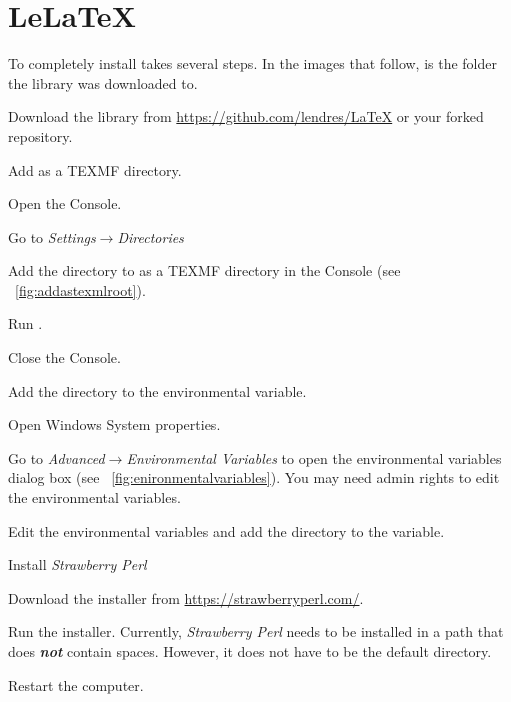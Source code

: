 \section{LeLaTeX}
To completely install \lelatex{} takes several steps.  In the images that follow,  is the folder the \lelatex{} library was downloaded to.

\begin{outline}
	\item Download the library from \href{https://github.com/lendres/LaTeX}{https://github.com/lendres/LaTeX} or your forked repository.
	\item Add \lelatex{} as a TEXMF directory.
	\begin{outline}
		\item Open the \miktex{} Console.
		\item Go to \emph{Settings$\rightarrow$Directories}
		\item Add the directory to as a TEXMF directory in the \miktex{} Console (see \figurename~\ref{fig:addastexmlroot}).
        \item Run .
		\item Close the \miktex{} Console.
	\end{outline}
	\item Add the  directory to the  environmental variable.
	\begin{outline}
		\item Open Windows System properties.
		\item Go to \emph{Advanced$\rightarrow$Environmental Variables} to open the environmental variables dialog box (see \figurename~\ref{fig:enironmentalvariables}).  You may need admin rights to edit the environmental variables.
		\item Edit the environmental variables and add the  directory to the  variable.
	\end{outline}
	\item Install \emph{Strawberry Perl}
	\begin{outline}
		\item Download the installer from \href{https://strawberryperl.com/}{https://strawberryperl.com/}.
		\item Run the installer.  Currently, \emph{Strawberry Perl} needs to be installed in a path that does \textbf{\emph{not}} contain spaces.  However, it does not have to be the default directory.
	\end{outline}
	\item Restart the computer.
\end{outline}

